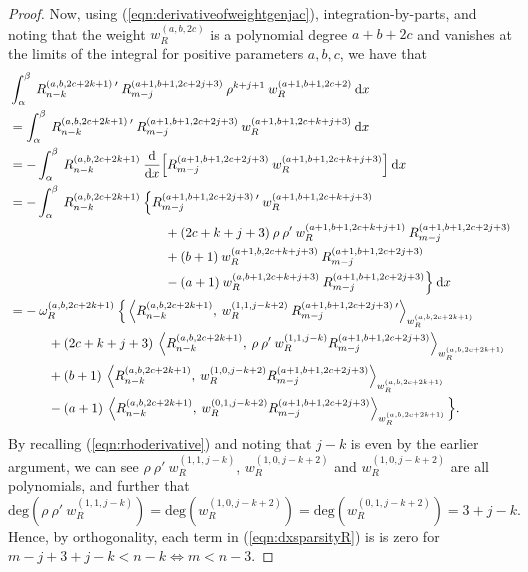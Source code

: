 \documentclass[11pt, oneside]{article}   	%
\newcommand{\ddx}{\frac{\mathrm{d}}{\mathrm{d}x}}
\newcommand{\genjac}{R}
\newcommand{\genjacnmk}{\genjac_{n-k}}
\newcommand{\genjacmmj}{\genjac_{m-j}}
\newcommand{\genjacw}{w_\genjac}
\newcommand{\normgenjac}{\omega_\genjac}
\begin{document}
\begin{proof}
Now, using (\ref{eqn:derivativeofweightgenjac}), integration-by-parts, and noting that the weight $\genjacw^{(a,b,2c)}$ is a polynomial degree $a+b+2c$ and vanishes at the limits of the integral for positive parameters $a,b,c$, we have that
\begin{align}
	&\int_\alpha^\beta \: \genjacnmk^{(a, b, 2c+2k+1) \: \prime} \: \genjacmmj^{(a+1, b+1, 2c+2j+3)} \: \rho^{k+j+1} \: \genjacw^{(a+1, b+1, 2c+2)} \: \D x \nonumber  \\
	&= \int_\alpha^\beta \: \genjacnmk^{(a, b, 2c+2k+1) \: \prime} \: \genjacmmj^{(a+1, b+1, 2c+2j+3)} \: \genjacw^{(a+1, b+1, 2c+k+j+3)} \: \D x \nonumber \\
	&= - \int_\alpha^\beta \: \genjacnmk^{(a, b, 2c+2k+1)} \: \ddx \Big[ \genjacmmj^{(a+1, b+1, 2c+2j+3)} \: \genjacw^{(a+1, b+1, 2c+k+j+3)} \Big] \: \D x \nonumber \\
	&= - \int_\alpha^\beta \: \genjacnmk^{(a, b, 2c+2k+1)} \: \Big\{ \genjacmmj^{(a+1, b+1, 2c+2j+3) \: \prime} \: \genjacw^{(a+1, b+1, 2c+k+j+3)} \nonumber \\
	&\quad \quad \quad \quad \quad \quad \quad \quad \quad \quad \quad \quad + (2c+k+j+3) \: \rho \: \rho' \:  \genjacw^{(a+1, b+1, 2c+k+j+1)} \: \genjacmmj^{(a+1, b+1, 2c+2j+3)} \nonumber \\
	&\quad \quad \quad \quad \quad \quad \quad \quad \quad \quad \quad \quad + (b+1) \: \genjacw^{(a+1, b, 2c+k+j+3)} \: \genjacmmj^{(a+1, b+1, 2c+2j+3)} \nonumber \\
	&\quad \quad \quad \quad \quad \quad \quad \quad \quad \quad \quad \quad - (a+1) \: \genjacw^{(a, b+1, 2c+k+j+3)} \: \genjacmmj^{(a+1, b+1, 2c+2j+3)} \Big\} \: \D x \nonumber \\
	&= - \: \normgenjac^{(a, b, 2c+2k+1)} \:  \Big\{ \ip<\genjacnmk^{(a, b, 2c+2k+1)}, \: \genjacw^{(1, 1, j-k+2)} \: \genjacmmj^{(a+1, b+1, 2c+2j+3) \: \prime}>_{\genjacw^{(a, b, 2c+2k+1)}} \nonumber \\
		&\quad \quad \quad + (2c+k+j+3) \: \ip<\genjacnmk^{(a, b, 2c+2k+1)}, \: \rho \: \rho' \: \genjacw^{(1,1, j-k)} \genjacmmj^{(a+1, b+1, 2c+2j+3)} >_{\genjacw^{(a, b, 2c+2k+1)}} \nonumber \\
		&\quad \quad \quad + (b+1) \: \ip<\genjacnmk^{(a, b, 2c+2k+1)}, \: \genjacw^{(1,0, j-k+2)} \genjacmmj^{(a+1, b+1, 2c+2j+3)} >_{\genjacw^{(a, b, 2c+2k+1)}} \nonumber \\
		&\quad \quad \quad - (a+1) \: \ip<\genjacnmk^{(a, b, 2c+2k+1)}, \: \genjacw^{(0,1, j-k+2)} \genjacmmj^{(a+1, b+1, 2c+2j+3)} >_{\genjacw^{(a, b, 2c+2k+1)}} \Big\}. \label{eqn:dxsparsityR}
\end{align}
By recalling (\ref{eqn:rhoderivative}) and noting that $j-k$ is even by the earlier argument, we can see $\rho \: \rho' \: \genjacw^{(1,1, j-k)}$, $\genjacw^{(1,0, j-k+2)}$ and $\genjacw^{(1,0, j-k+2)}$ are all polynomials, and further that 
$$\text{deg}(\rho \: \rho' \: \genjacw^{(1,1, j-k)}) = \text{deg} (\genjacw^{(1,0, j-k+2)}) = \text{deg} (\genjacw^{(0,1, j-k+2)}) = 3 + j-k.$$ 
Hence, by orthogonality, each term in (\ref{eqn:dxsparsityR}) is is zero for $m-j+3+j-k < n-k \iff m < n - 3$.


\end{proof}
\end{document}
